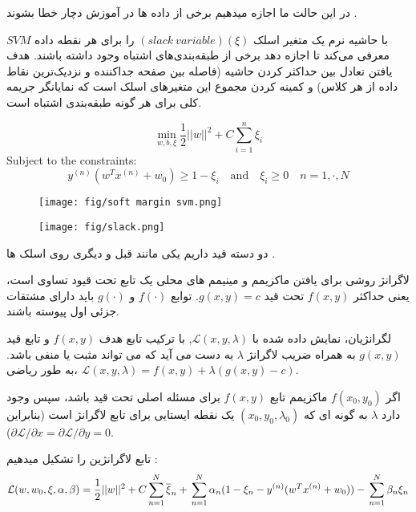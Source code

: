 \documentclass[12pt]{article}
\begin{document}
در این حالت ما اجازه میدهیم برخی از داده ها در آموزش دچار خطا بشوند .

$SVM$
با حاشیه نرم یک متغیر اسلک 
$(slack\:variable) ( \xi )$ 
را برای هر نقطه داده معرفی می‌کند تا اجازه دهد برخی از طبقه‌بندی‌های اشتباه وجود داشته باشند. هدف یافتن تعادل بین حداکثر کردن حاشیه (فاصله بین صفحه جداکننده و نزدیک‌ترین نقاط داده از هر کلاس) و کمینه کردن مجموع این متغیرهای اسلک است که نمایانگر جریمه کلی برای هر گونه طبقه‌بندی اشتباه است.
\begin{latin}
    $$
\min_{w, b, \xi} \frac{1}{2} || w ||^2 + C \sum_{i=1}^{n} \xi_i
$$
Subject to the constraints:
$$
y^{(n)} (w^T x^{(n)} + w_0) \geq 1 - \xi_i \quad \text{and} \quad \xi_i \geq 0 \quad n = 1, \cdot , N
$$
\end{latin}

\begin{figure}[!h]
\centering
\texttt{[image: fig/soft margin svm.png]}

\label{fig:soft}
\end{figure}

\begin{figure}[!h]
\centering
\texttt{[image: fig/slack.png]}

\label{fig:slack}
\end{figure}
دو دسته قید داریم
یکی مانند قبل و دیگری روی اسلک ها .

لاگرانژ روشی برای یافتن ماکزیمم و مینیمم های محلی یک تابع تحت قیود تساوی است، یعنی حداکثر $f(x,y)$ تحت قید $g(x,y)=c$. توابع $f(\cdot)$ و $g(\cdot)$ باید دارای مشتقات جزئی اول پیوسته باشند.

لگرانژیان، نمایش داده شده با $\mathcal{L}(x, y, \lambda)$, با ترکیب تابع هدف $f(x, y)$ و تابع قید $g(x, y)$ به همراه ضریب لاگرانژ $\lambda$ به دست می آید که می تواند مثبت یا منفی باشد. به طور ریاضی، $\mathcal{L}(x, y, \lambda) = f(x, y) + \lambda(g(x, y)-c)$.

اگر $f(x_0, y_0)$ ماکزیمم تابع $f(x, y)$ برای مسئله اصلی تحت قید باشد، سپس وجود دارد $\lambda$ به گونه ای که $(x_0, y_0, \lambda_0)$ یک نقطه ایستایی برای تابع لاگرانژ است (بنابراین $\partial \mathcal{L}/\partial x = \partial \mathcal{L}/\partial y = 0$).

تابع لاگرانژین را تشکیل میدهیم : 
$$
\mathcal{L}(w,w_{0},\xi,\alpha,\beta) = \frac{1}{2}||w||^{2}+C\sum_{n=1}^{N}\overline{\xi}_{n} + \\
\sum_{n=1}^{N}\alpha_{n}(1-\xi_{n}-y^{(n)}(w^{T}x^{(n)}+w_{0}))- \\
\sum_{n=1}^{N}\beta_{n}\xi_{n}
$$
\end{document}
